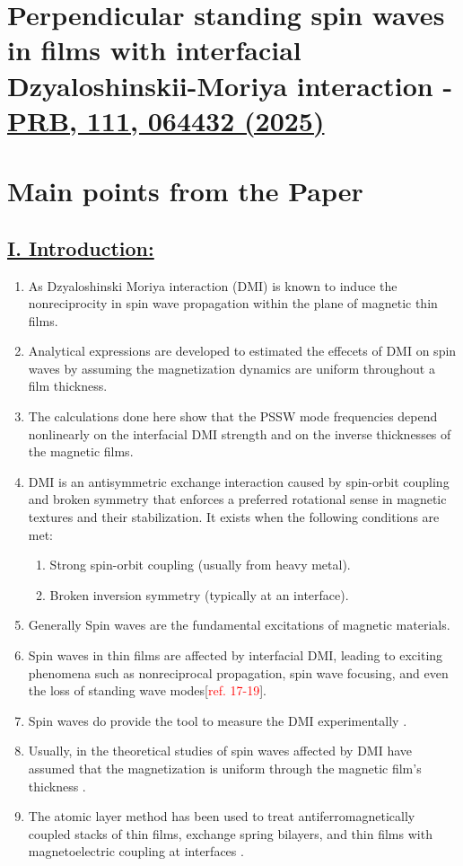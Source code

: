 \section{Perpendicular standing spin waves in films with interfacial Dzyaloshinskii-Moriya interaction - \href{https://doi.org/10.1103/PhysRevB.111.064432}{PRB, 111, 064432 (2025)}}

\section*{Main points from the Paper}
\subsection*{\underline{I. Introduction:}}
\begin{enumerate}
    \item As Dzyaloshinski Moriya interaction (DMI) is known to induce the nonreciprocity in spin wave propagation within the plane of magnetic thin films.
    \item Analytical expressions are developed to estimated the effecets of DMI on spin waves by assuming the magnetization dynamics are uniform throughout a film thickness.
    \item The calculations done here show that the PSSW mode frequencies depend nonlinearly on the interfacial DMI strength and on the inverse thicknesses of the magnetic films.
    \item DMI is an antisymmetric exchange interaction caused by spin-orbit coupling and broken symmetry that enforces a preferred rotational sense in magnetic textures and their stabilization. It exists when the following conditions are met:
    \begin{enumerate}[\ding{212}]
        \item Strong spin-orbit coupling (usually from heavy metal).
        \item Broken inversion symmetry (typically at an interface).
    \end{enumerate}
    \item Generally Spin waves are the fundamental excitations of magnetic materials. 
    \item Spin waves in thin films are affected by interfacial DMI, leading to exciting phenomena such as nonreciprocal propagation, spin wave focusing, and even the loss of standing wave modes[\textcolor{red}{ref. 17-19}].
    \item Spin waves do provide the tool to measure the DMI experimentally \cite{stashkevich2015experimental,nembach2015linear}.
    \item Usually, in the theoretical studies of spin waves affected by DMI have assumed that the magnetization is uniform through the magnetic film's thickness \cite{moon2013spin,cortes2013influence}.
    \item The atomic layer method has been used to treat antiferromagnetically coupled stacks of thin films, exchange spring bilayers, and thin films with magnetoelectric coupling at interfaces \cite{moore2014spin}.
\end{enumerate}
